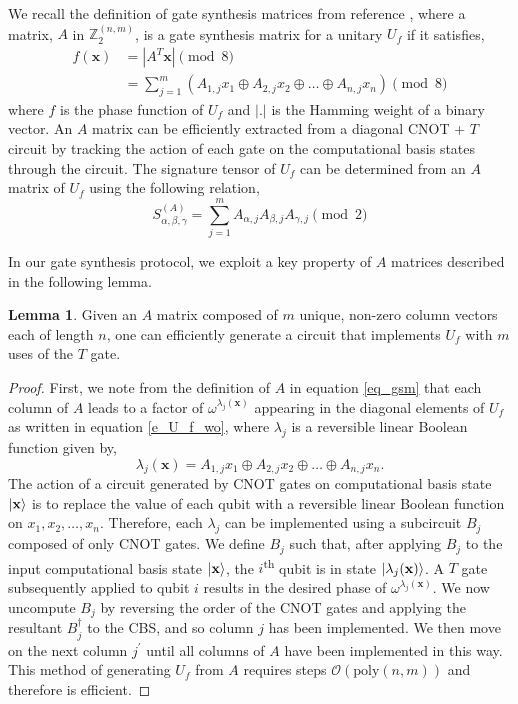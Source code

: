 \documentclass[notitlepage]{article}
\theoremstyle{definition}
\theoremstyle{problem}
\theoremstyle{lemma}
\newtheorem{lemma}{Lemma}[section]
\begin{document}
We recall the definition of gate synthesis matrices from reference \cite{4_Campbell_2017}, where a matrix, $A$ in $\mathbb{Z}_2^{(n,m)}$, is a gate synthesis matrix for a unitary $U_f$ if it satisfies,
\begin{align}
f(\mathbf{x}) &= |A^T\mathbf{x}| \pmod{8} \label{eq_gsm}\\&= \sum_{j=1}^{m}(A_{1,j}x_1 \oplus A_{2,j}x_2 \oplus \dots \oplus A_{n,j}x_n) \pmod{8}
\end{align}
where $f$ is the phase function of $U_f$ and $|.|$ is the Hamming weight of a binary vector. An $A$ matrix can be efficiently extracted from a diagonal CNOT + $T$ circuit by tracking the action of each gate on the computational basis states through the circuit. 
The signature tensor of $U_f$ can be determined from an $A$ matrix of $U_f$ using the following relation,
\begin{equation}
	\label{eq_sig}
	S^{(A)}_{\alpha,\beta,\gamma} = \sum_{j=1}^m A_{\alpha,j}A_{\beta,j}A_{\gamma,j} \pmod{2}
\end{equation}

In our gate synthesis protocol, we exploit a key property of $A$ matrices described in the following lemma.%
\begin{lemma}
	\label{l_gsm2circ}
	Given an $A$ matrix composed of $m$ unique, non-zero column vectors each of length $n$, one can efficiently generate a circuit that implements $U_f$ with $m$ uses of the $T$ gate.
\end{lemma}
\begin{proof}
	First, we note from the definition of $A$ in equation \ref{eq_gsm} that each column of $A$ leads to a factor of $\omega^{\lambda_j(\mathbf{x})}$ appearing in the diagonal elements of $U_f$ as written in equation \ref{e_U_f_wo}, where $\lambda_j$ is a reversible linear Boolean function given by,
	\begin{equation}
	\lambda_j(\mathbf{x}) = A_{1,j}x_1 \oplus A_{2,j}x_2 \oplus \dots \oplus A_{n,j}x_n.
	\end{equation}
	The action of a circuit generated by CNOT gates on computational basis state $\left\vert{\mathbf{x}}\right\rangle$ is to replace the value of each qubit with a reversible linear Boolean function on $x_1, x_2, \dots, x_n$. Therefore, each $\lambda_j$ can be implemented using a subcircuit $B_j$ composed of only CNOT gates. We define $B_j$ such that, after applying $B_j$ to the input computational basis state $\left\vert{\mathbf{x}}\right\rangle$, the $i$\textsuperscript{th} qubit is in state $\left\vert{\lambda_j(\mathbf{x})}\right\rangle$. A $T$ gate subsequently applied to qubit $i$ results in the desired phase of $\omega^{\lambda_j(\mathbf{x})}$. We now uncompute $B_j$ by reversing the order of the CNOT gates and applying the resultant $B_j^\dagger$ to the CBS, and so column $j$ has been implemented. We then move on the next column $j^\prime$ until all columns of $A$ have been implemented in this way. This method of generating $U_f$ from $A$ requires steps $\mathcal{O}(\textrm{poly}(n,m))$ and therefore is efficient.
\end{proof}
\end{document}
